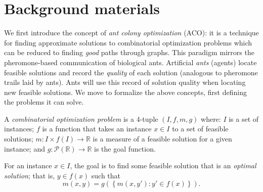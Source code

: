 \section{Background materials}

We first introduce the concept of \emph{ant colony optimization} (ACO): it is a technique for finding approximate solutions to combinatorial optimization problems which can be reduced to finding \emph{good} paths through graphs. This paradigm mirrors the pheromone-based communication of biological ants. Artificial \emph{ants} (agents) locate feasible solutions and record the \emph{quality} of each solution (analogous to pheromone trails laid by ants). Ants will use this record of solution quality when locating new feasible solutions. We move to formalize the above concepts, first defining the problems it can solve.

\begin{definition}
    A \emph{combinatorial optimization problem} is a 4-tuple $(I, f, m, g)$ where: $I$ is a set of instances; $f$ is a function that takes an instance $x \in I$ to a set of feasible solutions; $m: I \times f(I) \to \mathbb R$ is a measure of a feasible solution for a given instance; and $g: \mathcal P(\mathbb R) \to \mathbb R$ is the goal function.
\end{definition}

For an instance $x \in I$, the goal is to find some feasible solution that is an \emph{optimal solution}; that is, $y \in f(x)$ such that
\[ m(x,y) = g\left(\left\{m(x, y'): y' \in f(x)\right\}\right). \]

